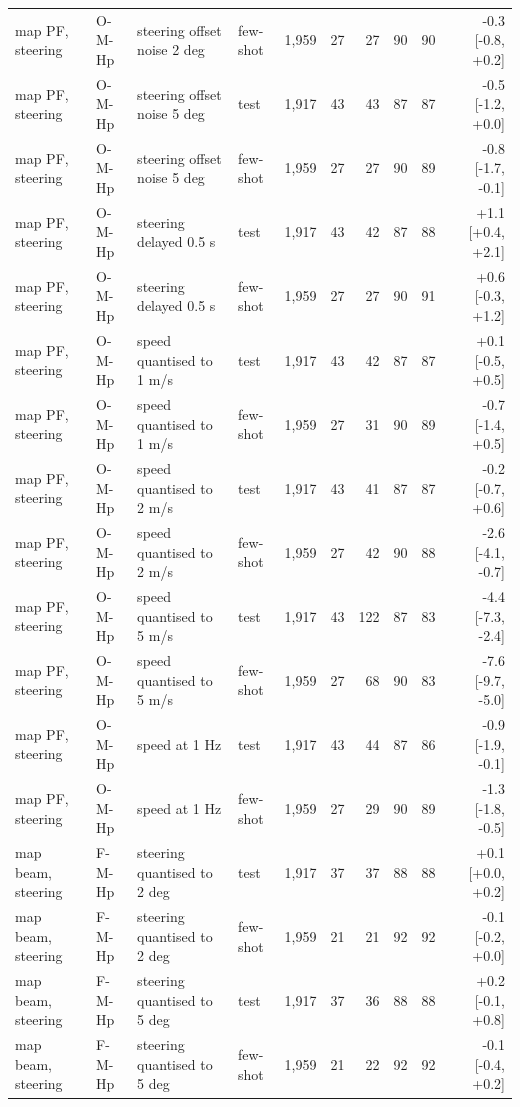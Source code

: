 \begin{table}[t]
\begin{tabular}{llllrrrrrr}
map PF, steering & O-M-Hp & steering offset noise 2 deg & few-shot & 1{,}959 & 27 & 27 & 90 & 90 & -0.3 [-0.8, +0.2] \\
map PF, steering & O-M-Hp & steering offset noise 5 deg & test & 1{,}917 & 43 & 43 & 87 & 87 & -0.5 [-1.2, +0.0] \\
map PF, steering & O-M-Hp & steering offset noise 5 deg & few-shot & 1{,}959 & 27 & 27 & 90 & 89 & -0.8 [-1.7, -0.1] \\
map PF, steering & O-M-Hp & steering delayed 0.5 s & test & 1{,}917 & 43 & 42 & 87 & 88 & +1.1 [+0.4, +2.1] \\
map PF, steering & O-M-Hp & steering delayed 0.5 s & few-shot & 1{,}959 & 27 & 27 & 90 & 91 & +0.6 [-0.3, +1.2] \\
map PF, steering & O-M-Hp & speed quantised to 1 m/s & test & 1{,}917 & 43 & 42 & 87 & 87 & +0.1 [-0.5, +0.5] \\
map PF, steering & O-M-Hp & speed quantised to 1 m/s & few-shot & 1{,}959 & 27 & 31 & 90 & 89 & -0.7 [-1.4, +0.5] \\
map PF, steering & O-M-Hp & speed quantised to 2 m/s & test & 1{,}917 & 43 & 41 & 87 & 87 & -0.2 [-0.7, +0.6] \\
map PF, steering & O-M-Hp & speed quantised to 2 m/s & few-shot & 1{,}959 & 27 & 42 & 90 & 88 & -2.6 [-4.1, -0.7] \\
map PF, steering & O-M-Hp & speed quantised to 5 m/s & test & 1{,}917 & 43 & 122 & 87 & 83 & -4.4 [-7.3, -2.4] \\
map PF, steering & O-M-Hp & speed quantised to 5 m/s & few-shot & 1{,}959 & 27 & 68 & 90 & 83 & -7.6 [-9.7, -5.0] \\
map PF, steering & O-M-Hp & speed at 1 Hz & test & 1{,}917 & 43 & 44 & 87 & 86 & -0.9 [-1.9, -0.1] \\
map PF, steering & O-M-Hp & speed at 1 Hz & few-shot & 1{,}959 & 27 & 29 & 90 & 89 & -1.3 [-1.8, -0.5] \\
map beam, steering & F-M-Hp & steering quantised to 2 deg & test & 1{,}917 & 37 & 37 & 88 & 88 & +0.1 [+0.0, +0.2] \\
map beam, steering & F-M-Hp & steering quantised to 2 deg & few-shot & 1{,}959 & 21 & 21 & 92 & 92 & -0.1 [-0.2, +0.0] \\
map beam, steering & F-M-Hp & steering quantised to 5 deg & test & 1{,}917 & 37 & 36 & 88 & 88 & +0.2 [-0.1, +0.8] \\
map beam, steering & F-M-Hp & steering quantised to 5 deg & few-shot & 1{,}959 & 21 & 22 & 92 & 92 & -0.1 [-0.4, +0.2] \\

\end{tabular}
\end{table}
